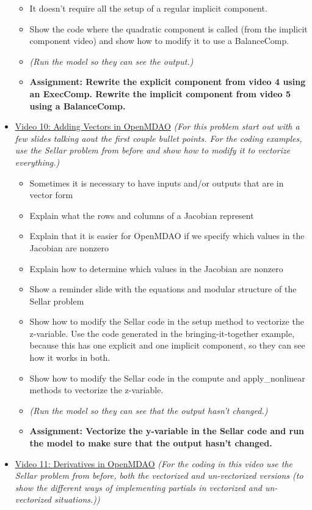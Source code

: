 \documentclass[12pt, letterpaper]{article}
\begin{document}
\begin{itemize}
\begin{itemize}
			\item It doesn’t require all the setup of a regular implicit component.
			\item Show the code where the quadratic component is called (from the implicit component video) and show how to modify it to use a BalanceComp.
			\item \textit{(Run the model so they can see the output.)}
			\item \textbf{Assignment: Rewrite the explicit component from video 4 using an ExecComp. Rewrite the implicit component from video 5 using a BalanceComp.}
		\end{itemize}
	\item \underline{Video 10: Adding Vectors in OpenMDAO} \textit{(For this problem start out with a few slides talking aout the first couple bullet points. For the coding examples, use the Sellar problem from before and show how to modify it to vectorize everything.)}
		\begin{itemize}
			\item 	Sometimes it is necessary to have inputs and/or outputs that are in vector form
			\item Explain what the rows and columns of a Jacobian represent
			\item Explain that it is easier for OpenMDAO if we specify which values in the Jacobian are nonzero
			\item Explain how to determine which values in the Jacobian are nonzero
			\item Show a reminder slide with the equations and modular structure of the Sellar problem
			\item Show how to modify the Sellar code in the setup method to vectorize the z-variable. Use the code generated in the bringing-it-together example, because this has one explicit and one implicit component, so they can see how it works in both.
			\item Show how to modify the Sellar code in the compute and apply\_nonlinear methods to vectorize the z-variable. 
			\item \textit{(Run the model so they can see that the output hasn’t changed.)}
			\item \textbf{Assignment: Vectorize the y-variable in the Sellar code and run the model to make sure that the output hasn’t changed.}
		\end{itemize}
	\item \underline{Video 11: Derivatives in OpenMDAO} \textit{(For the coding in this video use the Sellar problem from before, both the vectorized and un-vectorized versions (to show the different ways of implementing partials in vectorized and un-vectorized situations.))}

\end{itemize}
\end{document}
